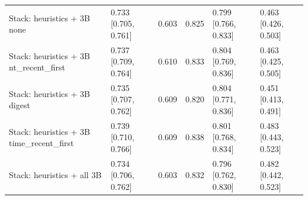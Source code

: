 \begin{tabular}{llllll}
Stack: heuristics + 3B none & 0.733 [0.705, 0.761] & 0.603 & 0.825 & 0.799 [0.766, 0.833] & 0.463 [0.426, 0.503] \\
Stack: heuristics + 3B nt\_recent\_first & 0.737 [0.709, 0.764] & 0.610 & 0.833 & 0.804 [0.769, 0.836] & 0.463 [0.425, 0.505] \\
Stack: heuristics + 3B digest & 0.735 [0.707, 0.762] & 0.609 & 0.820 & 0.804 [0.771, 0.836] & 0.451 [0.413, 0.491] \\
Stack: heuristics + 3B time\_recent\_first & 0.739 [0.710, 0.766] & 0.609 & 0.838 & 0.801 [0.768, 0.834] & 0.483 [0.443, 0.523] \\
Stack: heuristics + all 3B & 0.734 [0.706, 0.762] & 0.603 & 0.832 & 0.796 [0.762, 0.830] & 0.482 [0.442, 0.523] \\
\bottomrule
\end{tabular}
